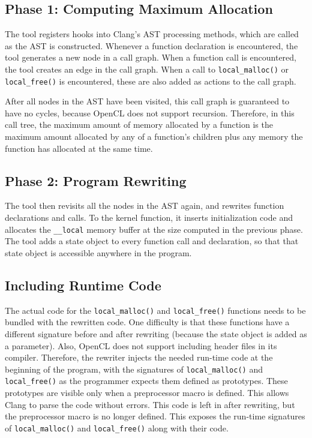 \documentclass{article}
\begin{document}
\subsection{Phase 1: Computing Maximum Allocation}
The tool registers hooks into Clang's AST processing methods, which are called as the AST is constructed. Whenever a function declaration is encountered, the tool generates a new node in a call graph. When a function call is encountered, the tool creates an edge in the call graph. When a call to \texttt{local\_malloc()} or \texttt{local\_free()} is encountered, these are also added as actions to the call graph.

After all nodes in the AST have been visited, this call graph is guaranteed to have no cycles, because OpenCL does not support recursion. Therefore, in this call tree, the maximum amount of memory allocated by a function is the maximum amount allocated by any of a function's children plus any memory the function has allocated at the same time.

\subsection{Phase 2: Program Rewriting}
The tool then revisits all the nodes in the AST again, and rewrites function declarations and calls. To the kernel function, it inserts initialization code and allocates the \texttt{\_\_local} memory buffer at the size computed in the previous phase. The tool adds a state object to every function call and declaration, so that that state object is accessible anywhere in the program.

\subsection{Including Runtime Code}
The actual code for the \texttt{local\_malloc()} and \texttt{local\_free()} functions needs to be bundled with the rewritten code. One difficulty is that these functions have a different signature before and after rewriting (because the state object is added as a parameter). Also, OpenCL does not support including header files in its compiler. Therefore, the rewriter injects the needed run-time code at the beginning of the program, with the signatures of \texttt{local\_malloc()} and \texttt{local\_free()} as the programmer expects them defined as prototypes. These prototypes are visible only when a preprocessor macro is defined. This allows Clang to parse the code without errors. This code is left in after rewriting, but the preprocessor macro is no longer defined. This exposes the run-time signatures of \texttt{local\_malloc()} and \texttt{local\_free()} along with their code.
\end{document}
